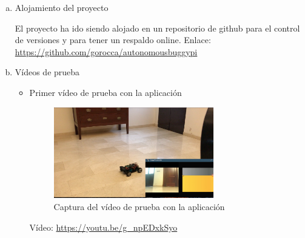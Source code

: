 \documentclass{pclass}
\begin{document}
\begin{enumerate}[a)]
	\item Alojamiento del proyecto
	
		El proyecto ha ido siendo alojado en un repositorio de github para el control de versiones y para tener un respaldo online. Enlace: \url{https://github.com/gorocca/autonomousbuggypi}
	
	\item Vídeos de prueba
		\begin{itemize}
			\item Primer vídeo de prueba con la aplicación
				\begin{figure}[H]
					\centering
					\includegraphics[width=0.7\textwidth]{img/capturaPrimerVideoApp}
					\caption{Captura del vídeo de prueba con la aplicación}
					\label{fig:capturaPrimerVideoApp}
				\end{figure}
		
				 Vídeo: \url{https://youtu.be/g_npEDxkSyo}
				
		\end{itemize}

\end{enumerate}
\end{document}
